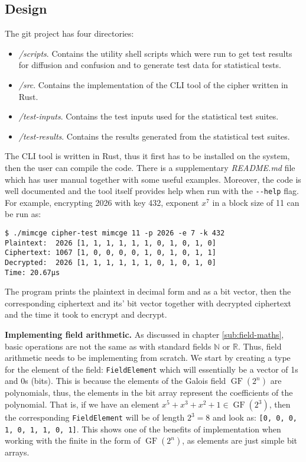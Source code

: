 \documentclass{Resources/UoBLab1}
\theoremstyle{definition}
\begin{document}
\subsection{Design}
The git project has four directories:
\begin{itemize}
    \item \textit{/scripts}. Contains the utility shell scripts which were run to get test results for diffusion and confusion and to generate test data for statistical tests.
    \item \textit{/src}. Contains the implementation of the CLI tool of the cipher written in Rust.
    \item \textit{/test-inputs}. Contains the test inputs used for the statistical test suites.
    \item \textit{/test-results}. Contains the results generated from the statistical test suites.
\end{itemize}
The CLI tool is written in Rust, thus it first has to be installed on the system, then the user can compile the code. There is a supplementary \textit{README.md} file which has user manual together with some useful examples. Moreover, the code is well documented and the tool itself provides help when run with the \verb|--help| flag. For example, encrypting 2026 with key 432, exponent $x^7$ in a block size of 11 can be run as:
\begin{verbatim}
$ ./mimcge cipher-test mimcge 11 -p 2026 -e 7 -k 432
Plaintext:  2026 [1, 1, 1, 1, 1, 1, 0, 1, 0, 1, 0]
Ciphertext: 1067 [1, 0, 0, 0, 0, 1, 0, 1, 0, 1, 1]
Decrypted:  2026 [1, 1, 1, 1, 1, 1, 0, 1, 0, 1, 0]
Time: 20.67µs
\end{verbatim}
The program prints the plaintext in decimal form and as a bit vector, then the corresponding ciphertext and its' bit vector together with decrypted ciphertext and the time it took to encrypt and decrypt.

\noindent\textbf{Implementing field arithmetic.} As discussed in chapter \ref{sub:field-maths}, basic operations are not the same as with standard fields $\mathbb{N}$ or $\mathbb{R}$. Thus, field arithmetic needs to be implementing from scratch. We start by creating a type for the element of the field: \verb|FieldElement| which will essentially be a vector of 1s and 0s (bits). This is because the elements of the Galois field $\operatorname{GF}(2^n)$ are polynomials, thus, the elements in the bit array represent the coefficients of the polynomial. That is, if we have an element $x^5+x^3+x^2+1 \in \operatorname{GF}(2^3)$, then the corresponding \verb|FieldElement| will be of length $2^3 = 8$ and look as: \verb|[0, 0, 0, 1, 0, 1, 1, 0, 1]|. This shows one of the benefits of implementation when working with the finite in the form of $\operatorname{GF}(2^n)$, as elements are just simple bit arrays. 
\end{document}
